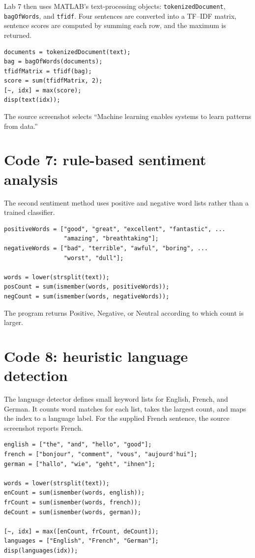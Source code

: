 Lab 7 then uses MATLAB's text-processing objects: \texttt{tokenizedDocument}, \texttt{bagOfWords}, and \texttt{tfidf}. Four sentences are converted into a TF--IDF matrix, sentence scores are computed by summing each row, and the maximum is returned.

\begin{lstlisting}[style=mlmatlab]
documents = tokenizedDocument(text);
bag = bagOfWords(documents);
tfidfMatrix = tfidf(bag);
score = sum(tfidfMatrix, 2);
[~, idx] = max(score);
disp(text(idx));
\end{lstlisting}

The source screenshot selects ``Machine learning enables systems to learn patterns from data.''

\section{Code 7: rule-based sentiment analysis}

The second sentiment method uses positive and negative word lists rather than a trained classifier.

\begin{lstlisting}[style=mlmatlab]
positiveWords = ["good", "great", "excellent", "fantastic", ...
                 "amazing", "breathtaking"];
negativeWords = ["bad", "terrible", "awful", "boring", ...
                 "worst", "dull"];

words = lower(strsplit(text));
posCount = sum(ismember(words, positiveWords));
negCount = sum(ismember(words, negativeWords));
\end{lstlisting}

The program returns Positive, Negative, or Neutral according to which count is larger.

\section{Code 8: heuristic language detection}

The language detector defines small keyword lists for English, French, and German. It counts word matches for each list, takes the largest count, and maps the index to a language label. For the supplied French sentence, the source screenshot reports French.

\begin{lstlisting}[style=mlmatlab]
english = ["the", "and", "hello", "good"];
french = ["bonjour", "comment", "vous", "aujourd'hui"];
german = ["hallo", "wie", "geht", "ihnen"];

words = lower(strsplit(text));
enCount = sum(ismember(words, english));
frCount = sum(ismember(words, french));
deCount = sum(ismember(words, german));

[~, idx] = max([enCount, frCount, deCount]);
languages = ["English", "French", "German"];
disp(languages(idx));
\end{lstlisting}

